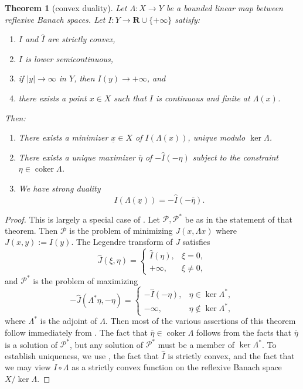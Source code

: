 \documentclass[reqno,11pt]{amsart}
\newcommand{\RR}{\mathbf{R}}
\DeclareMathOperator{\coker}{coker}
\newcommand{\dfn}[1]{\emph{#1}\index{#1}}
\newtheorem{theorem}{Theorem}[section]
\theoremstyle{definition}
\numberwithin{equation}{section}
\begin{document}
\begin{theorem}[convex duality]\label{abstract convex analysis}
Let $\Lambda : X \to Y$ be a bounded linear map between reflexive Banach spaces.
Let $I: Y \to \RR \cup \{+\infty\}$ satisfy:
\begin{enumerate}
\item $I$ and $\hat I$ are strictly convex,
\item $I$ is lower semicontinuous,
\item if $|y| \to \infty$ in $Y$, then $I(y) \to +\infty$, and 
\item there exists a point $x \in X$ such that $I$ is continuous and finite at $\Lambda(x)$.
\end{enumerate}
Then:
\begin{enumerate}
\item There exists a minimizer $\underline x \in X$ of $I(\Lambda(x))$, unique modulo $\ker \Lambda$.
\item There exists a unique maximizer $\overline \eta$ of $-\hat I(-\eta)$ subject to the constraint $\eta \in \coker \Lambda$.
\item We have \dfn{strong duality}
\begin{equation}\label{abstract strong duality}
I(\Lambda(\underline x)) = -\hat I(-\overline \eta).
\end{equation}
\end{enumerate}
\end{theorem}
\begin{proof}
This is largely a special case of \cite[Chapter IV, Theorem 4.2]{Ekeland99}.
Let $\mathscr P, \mathscr P^*$ be as in the statement of that theorem.
Then $\mathscr P$ is the problem of minimizing $J(x, \Lambda x)$ where $J(x, y) := I(y)$.
The Legendre transform of $J$ satisfies 
$$\hat J(\xi, \eta) = \begin{cases} \hat I(\eta), & \xi = 0, \\
	+\infty, &\xi \neq 0,
\end{cases}$$
and $\mathscr P^*$ is the problem of maximizing
$$-\hat J(\Lambda^* \eta, -\eta) = \begin{cases}
	-\hat I(-\eta), &\eta \in \ker \Lambda^*, \\
	-\infty, &\eta \notin \ker \Lambda^*,
\end{cases}$$
where $\Lambda^*$ is the adjoint of $\Lambda$.
Then most of the various assertions of this theorem follow immediately from \cite[Chapter IV, Theorem 4.2]{Ekeland99}.
The fact that $\overline \eta \in \coker \Lambda$ follows from the facts that $\overline \eta$ is a solution of $\mathscr P^*$, but any solution of $\mathscr P^*$ must be a member of $\ker \Lambda^*$. 
To establish uniqueness, we use \cite[Chapter II, Proposition 1.2]{Ekeland99}, the fact that $\hat I$ is strictly convex, and the fact that we may view $I \circ \Lambda$ as a strictly convex function on the reflexive Banach space $X/\ker \Lambda$.
\end{proof}
\end{document}
